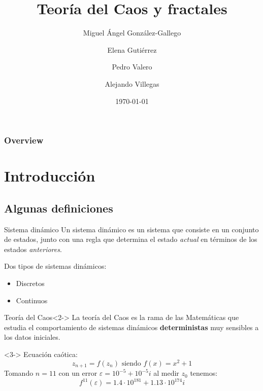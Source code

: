 \documentclass[8pt]{beamer}
\title[CyC]{Teoría del Caos y fractales} %
\author[]{Miguel Ángel González-Gallego \and Elena Gutiérrez \and Pedro Valero \and Alejando Villegas} %
\institute[UAM] %
{
Universidad Autónoma de Madrid\\ %
\medskip
\textit{Complejidad y Computación}
}
\date{\today} %
\begin{document}
\begin{frame}
\titlepage %
\end{frame}


\begin{frame}
\frametitle{Overview} %
\setcounter{tocdepth}{3}
\begin{multicols}{2}
\tableofcontents
\end{multicols}
\end{frame}



\section{Introducción}
\subsection{Algunas definiciones}
\begin{frame}

\begin{block}{Sistema dinámico}\label{def:sistemaDinamico}
Un sistema dinámico es un sistema que consiste en un conjunto de estados, junto con una regla que determina el estado \emph{actual} en términos de los estados \emph{anteriores}.
\end{block}

Dos tipos de sistemas dinámicos:
\begin{itemize}
\item Discretos
\item Continuos
\end{itemize}

\begin{block}{Teoría del Caos}<2->
La teoría del Caos es la rama de las Matemáticas que estudia el comportamiento de sistemas dinámicos \textbf{deterministas} muy sensibles a los datos iniciales.
\end{block}

\begin{example}<3->
Ecuación caótica:
\[z_{n+1} = f(z_n) \text{ siendo } f(x) = x^2+1\]
Tomando $n=11$ con un error $ε=10^{-5}+10^{-5}i$ al medir $z_0$ tenemos:
\[f^{11}(ε)=1.4 \cdot 10^{181} + 1.13\cdot 10^{174}i\]
\end{example}
\end{frame}
\end{document}
